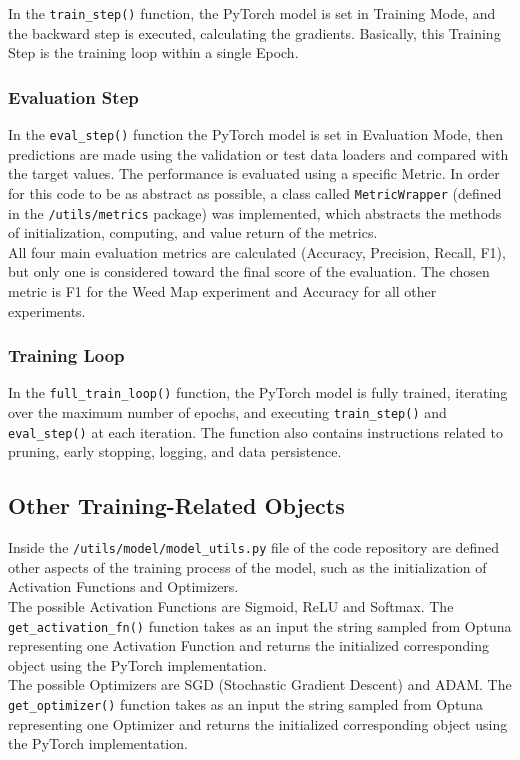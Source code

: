 In the \texttt{train\_step()} function, the PyTorch model is set in Training Mode, and the backward step is executed, calculating the gradients.
Basically, this Training Step is the training loop within a single Epoch.

\subsubsection{Evaluation Step}

In the \texttt{eval\_step()} function the PyTorch model is set in Evaluation Mode, then predictions are made using the validation or test data loaders and compared with the target values.
The performance is evaluated using a specific Metric. In order for this code to be as abstract as possible, a class called \texttt{MetricWrapper} (defined in the \texttt{/utils/metrics} package) was implemented, which abstracts the methods of initialization, computing, and value return of the metrics.
\\[0.3cm]All four main evaluation metrics are calculated (Accuracy, Precision, Recall, F1), but only one is considered toward the final score of the evaluation. The chosen metric is F1 for the Weed Map experiment and Accuracy for all other experiments.

\subsubsection{Training Loop}

In the \texttt{full\_train\_loop()} function, the PyTorch model is fully trained, iterating over the maximum number of epochs, and executing \texttt{train\_step()} and \texttt{eval\_step()} at each iteration.
The function also contains instructions related to pruning, early stopping, logging, and data persistence.

\subsection{Other Training-Related Objects}

Inside the \texttt{/utils/model/model\_utils.py} file of the code repository \cite{Repository-THESIS} are defined other aspects of the training process of the model, such as the initialization of Activation Functions and Optimizers.
\\[0.3cm]The possible Activation Functions are Sigmoid, ReLU and Softmax. The \newline\texttt{get\_activation\_fn()} function takes as an input the string sampled from Optuna representing one Activation Function and returns the initialized corresponding object using the PyTorch implementation.
\\[0.3cm]The possible Optimizers are SGD (Stochastic Gradient Descent) and ADAM. The \texttt{get\_optimizer()} function takes as an input the string sampled from Optuna representing one Optimizer and returns the initialized corresponding object using the PyTorch implementation.




